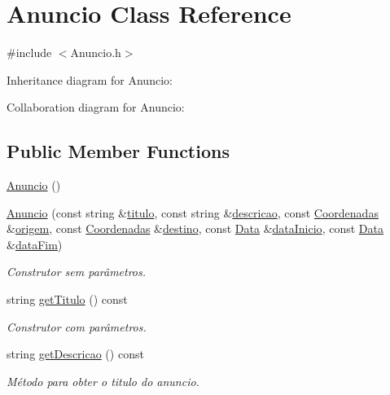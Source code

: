 \hypertarget{class_anuncio}{\section{Anuncio Class Reference}
\label{class_anuncio}
}


{\ttfamily \#include $<$Anuncio.\+h$>$}



Inheritance diagram for Anuncio\+:


Collaboration diagram for Anuncio\+:
\subsection*{Public Member Functions}
\begin{DoxyCompactItemize}
\item 
\hyperlink{class_anuncio_a97da342f390c8ee647d60cf29a923667}{Anuncio} ()
\item 
\hyperlink{class_anuncio_ad0adf24f36f64c2c786871e8f29ad8b5}{Anuncio} (const string \&\hyperlink{class_anuncio_adb34bedd8220f42b9ee37662c21313e6}{titulo}, const string \&\hyperlink{class_anuncio_aa6a9eb8d08cb06d16061b006eb2c8b97}{descricao}, const \hyperlink{class_coordenadas}{Coordenadas} \&\hyperlink{class_anuncio_a9b3f8ac29ebf2a44e24ea2273064a7f5}{origem}, const \hyperlink{class_coordenadas}{Coordenadas} \&\hyperlink{class_anuncio_acdac86595f84cfb8a2bf54c414857168}{destino}, const \hyperlink{class_data}{Data} \&\hyperlink{class_anuncio_abeb7d8c5fe5e7d127005044981a3cd3d}{data\+Inicio}, const \hyperlink{class_data}{Data} \&\hyperlink{class_anuncio_ac3b9182cc541cb68215f8aa09fb0e11a}{data\+Fim})
\begin{DoxyCompactList}\small\item\em Construtor sem parâmetros. \end{DoxyCompactList}\item 
string \hyperlink{class_anuncio_af712423e3645f7127f987d88793127d4}{get\+Titulo} () const 
\begin{DoxyCompactList}\small\item\em Construtor com parâmetros. \end{DoxyCompactList}\item 
string \hyperlink{class_anuncio_a693f59391a620851b4ac37063e8f4af4}{get\+Descricao} () const 
\begin{DoxyCompactList}\small\item\em Método para obter o titulo do anuncio. \end{DoxyCompactList}\item 

\end{DoxyCompactItemize}
